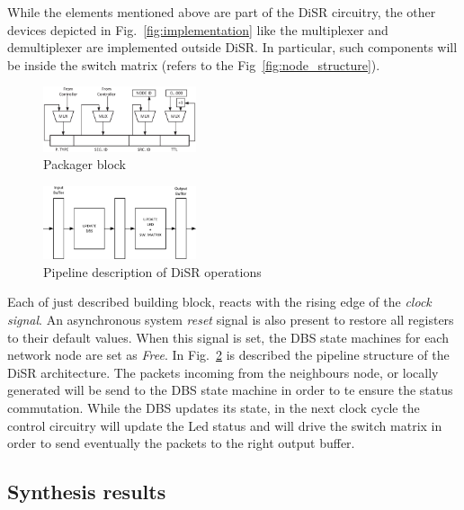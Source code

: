 While the elements mentioned above are part of the DiSR circuitry,
the other devices depicted in Fig.~\ref{fig:implementation} like the
multiplexer and demultiplexer are implemented outside DiSR. In
particular, such components will be inside the switch matrix  (refers
to the Fig~\ref{fig:node_structure}).

\begin{figure}
  \centering
  \includegraphics[width=0.40\textwidth]{pictures/packager.eps}
  \caption{Packager block}
 \label{fig:packager}
\end{figure}

\begin{figure}
  \centering
  \includegraphics[width=0.40\textwidth]{pictures/pipeline.eps}
  \caption{Pipeline description of DiSR operations}
 \label{fig:pipeline}
\end{figure}

Each of just described building block, reacts with the rising edge  of
the \emph{clock signal}. An asynchronous system \emph{reset} signal is
also present to restore all registers to their default values. When
this signal is set, the DBS state machines for each network
node are set as \emph{Free}.  
In Fig.~\ref{fig:pipeline} is described the pipeline structure of the
DiSR architecture. The packets incoming from the neighbours node, or
locally generated will be send to the DBS state machine in order to te
ensure the status commutation. While the DBS updates its state,  in the
next clock cycle the control circuitry will update the Led status and
will drive the switch matrix in order to send eventually the packets to
the  right output buffer.
\subsection{Synthesis results}

